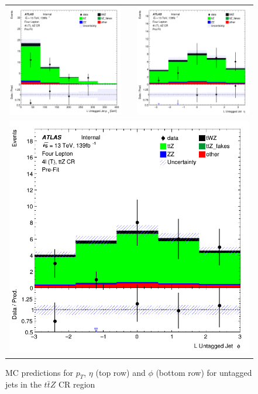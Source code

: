 \begin{figure}[htbp]
\centering
  \begin{tabular}{ccc}

    \includegraphics[width=.2\textwidth]{figures/PreFitPlots/lep4_ttZ_4T_L_UntaggedJet_pt} & &
    \includegraphics[width=.2\textwidth]{figures/PreFitPlots/lep4_ttZ_4T_L_UntaggedJet_eta} \\
    \multicolumn{3}{c}{\includegraphics[width=.2\textwidth]{figures/PreFitPlots/lep4_ttZ_4T_L_UntaggedJet_phi}}
  \end{tabular}
      \caption{MC predictions for $p_{T}$, $\eta$ (top row) and $\phi$ (bottom row) for untagged jets in the $t\bar{t}Z$ CR region }
  \label{fig:4lep-ttZ-CR-UntaggedjetPlots}
\end{figure}
\clearpage

